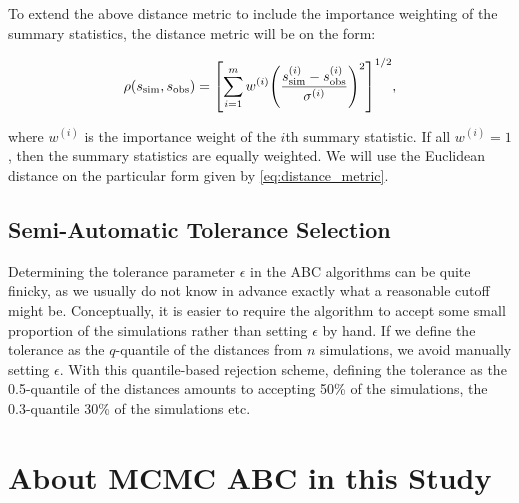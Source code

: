 To extend the above distance metric to include the importance weighting of the summary statistics, the distance metric will be on the form:

\begin{equation}\label{eq:distance_metric}
    \rho \qty(s_\mathrm{sim}, s_\mathrm{obs} ) = \qty[\sum_{i=1}^m w^{(i)} \qty(\frac{s_\mathrm{sim}^{(i)} - s_\mathrm{obs}^{(i)}}{\sigma^{(i)}} )^2 ]^{1/2},
\end{equation}

where $w^{(i)}$ is the importance weight of the $i$th summary statistic. If all $w^{(i)}=1$, then the summary statistics are equally weighted. We will use the Euclidean distance on the particular form given by \autoref{eq:distance_metric}. 

\subsection{Semi-Automatic Tolerance Selection}

Determining the tolerance parameter $\epsilon$ in the ABC algorithms can be quite finicky, as we usually do not know in advance exactly what a reasonable cutoff might be. Conceptually, it is easier to require the algorithm to accept some small proportion of the simulations rather than setting $\epsilon$ by hand. If we define the tolerance as the $q$-quantile of the distances from $n$ simulations, we avoid manually setting $\epsilon$. With this quantile-based rejection scheme, defining the tolerance as the 0.5-quantile of the distances amounts to accepting 50\% of the simulations, the 0.3-quantile 30\% of the simulations etc. 


\section{About MCMC ABC in this Study}

